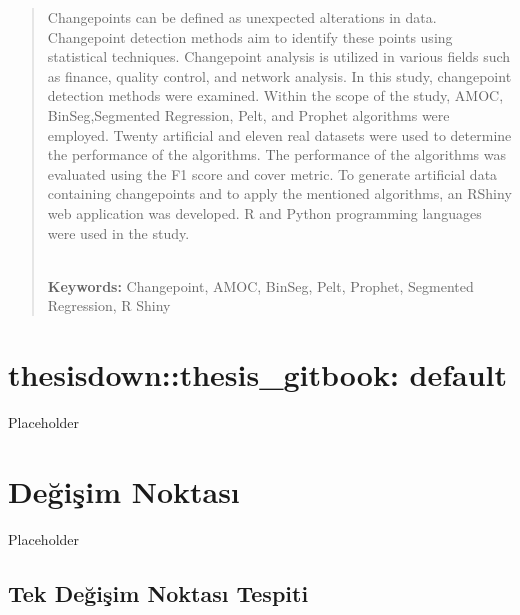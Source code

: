 \documentclass[12pt,twoside]{deuthesis}
\begin{document}
\begin{abstract}
	Changepoints can be defined as unexpected alterations in data. Changepoint detection methods aim to identify these points using statistical techniques. Changepoint analysis is utilized in various fields such as finance, quality control, and network analysis. In this study, changepoint detection methods were examined. Within the scope of the study, AMOC, BinSeg,Segmented Regression, Pelt, and Prophet algorithms were employed. Twenty artificial and eleven real datasets were used to determine the performance of the algorithms. The performance of the algorithms was evaluated using the F1 score and cover metric. To generate artificial data containing changepoints and to apply the mentioned algorithms, an RShiny web application was developed. R and Python programming languages were used in the study.\\
\strut \\

\textbf{Keywords:} Changepoint, AMOC, BinSeg, Pelt, Prophet, Segmented Regression, R Shiny
\end{abstract}


  \hypersetup{linkcolor=black}
  \setcounter{tocdepth}{2}
  \tableofcontents

  \listoftables

  \listoffigures



\mainmatter %
\pagestyle{fancyplain} %

\hypertarget{thesisdownthesis_gitbook-default}{%
\chapter{thesisdown::thesis\_gitbook: default}\label{thesisdownthesis_gitbook-default}}

Placeholder

\hypertarget{Bolum2}{%
\chapter{Değişim Noktası}\label{Bolum2}}

Placeholder

\hypertarget{tek-deux11fiux15fim-noktasux131-tespiti}{%
\section{Tek Değişim Noktası Tespiti}\label{tek-deux11fiux15fim-noktasux131-tespiti}}
\end{document}
